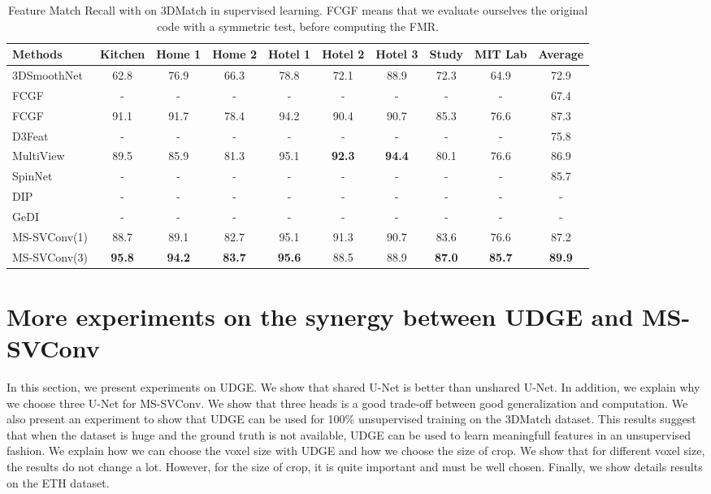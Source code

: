 \documentclass[10pt,twocolumn,letterpaper]{article}
\begin{document}
\begin{table*}[ht]
\small
\centering
\begin{tabular}[t]{lccccccccc}
\toprule
Methods & Kitchen & Home 1 & Home 2 & Hotel 1 & Hotel 2 & Hotel 3 & Study & MIT Lab & Average \\
\midrule
3DSmoothNet~\cite{gojcic2018perfect} &62.8&76.9&66.3&78.8&72.1&88.9&72.3&64.9&72.9\\
FCGF~\cite{choy2019fully} &-&-&-&-&-&-&-&-&67.4\\
FCGF~\cite{choy2019fully} &91.1&91.7&78.4&94.2&90.4&90.7&85.3&76.6&87.3\\
D3Feat~\cite{bai2020d3feat} &-&-&-&-&-&-&-&-&75.8\\
MultiView~\cite{Li_2020_CVPR} &89.5&85.9&81.3&95.1& \bf{92.3} & \bf{94.4} &80.1&76.6&86.9\\
SpinNet~\cite{ao2020SpinNet} &-&-&-&-&-&-&-&-&85.7\\
DIP~\cite{Poiesi2021} &-&-&-&-&-&-&-&-& -\\
GeDI~\cite{Poiesi2021gedi} &-&-&-&-&-&-&-&-& -\\
MS-SVConv(1) &88.7&89.1&82.7&95.1&91.3&90.7&83.6&76.6&87.2\\
MS-SVConv(3) & \bf{95.8} & \bf{94.2} & \bf{83.7} & \bf{95.6} & 88.5 & 88.9 & \bf{87.0} & \bf{85.7} & \bf{89.9}\\
\bottomrule
\end{tabular}
\caption{Feature Match Recall with  on 3DMatch in supervised learning. FCGF means that we evaluate ourselves the original code with a symmetric test, before computing the FMR.}
\label{tab:supervised21}
\end{table*}


\section{More experiments on the synergy between UDGE and MS-SVConv}
In this section, we present experiments on UDGE. We show that shared U-Net is better than unshared U-Net. In addition, we explain why we choose three U-Net for MS-SVConv. We show that three heads is a good trade-off between good generalization and computation. We also present an experiment to show that UDGE can be used for 100\% unsupervised training on the 3DMatch dataset. This results suggest that when the dataset is huge and the ground truth is not available, UDGE can be used to learn meaningfull features in an unsupervised fashion. We explain how we can choose the voxel size with UDGE and how we choose the size of crop. We show that for different voxel size, the results do not change a lot. However, for the size of crop, it is quite important and must be well chosen.
Finally, we show details results on the ETH dataset.
\end{document}
